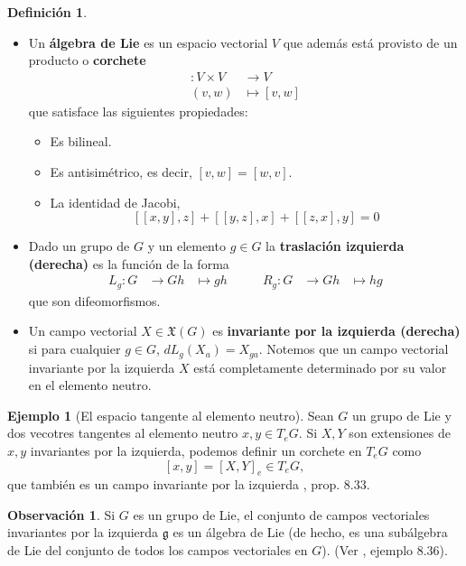 \documentclass[spanish]{book}
\theoremstyle{definition}
\newtheorem*{defn}{Definición}
\newtheorem*{obs}{Observación}
\newtheorem*{ejem}{Ejemplo}
\newcommand{\X}{\mathfrak{X}}
\begin{document}
	\begin{defn}\leavevmode
				\begin{itemize}
		\item Un \textbf{álgebra de Lie} es un espacio vectorial $V$ que además está provisto de un producto o \textbf{corchete}
		\begin{align*}
			[-,-]:V\times V&\to V\\
			(v,w)&\mapsto [v,w]
		\end{align*}
		que satisface las siguientes propiedades:
		\begin{itemize}
			\item Es bilineal.
			\item Es antisimétrico, es decir, $[v,w]=[w,v]$.
			\item La identidad de Jacobi,
			\[[[x,y],z]+[[y,z],x]+[[z,x],y]=0\]
		\end{itemize}


			\item Dado un grupo de $G$ y un elemento $g\in G$ la \textbf{traslación izquierda (derecha)} es la función de la forma
		\[\begin{aligned}
			L_g:G&\to G
			h&\mapsto gh
		\end{aligned}\qquad\begin{aligned}
		R_g:G&\to G
		h&\mapsto hg
	\end{aligned}\]
	que son difeomorfismos.
	\item Un campo vectorial $X\in\X(G)$ es \textbf{invariante por la izquierda (derecha)} si para cualquier $g\in G$, $dL_g(X_a)=X_{ga}$. Notemos que un campo vectorial invariante por la izquierda $X$ está completamente determinado por su valor en el elemento neutro. 
		\end{itemize}
	\end{defn}
	\begin{ejem}[El espacio tangente al elemento neutro]
		Sean $G$ un grupo de Lie y dos vecotres tangentes al elemento neutro $x,y\in T_eG$. Si $X,Y$ son extensiones de $x,y$ invariantes por la izquierda, podemos definir un corchete en $T_eG$ como
		\[[x,y]=[X,Y]_e\in T_eG,\]
		que también es un campo invariante por la izquierda \cite{Lee}, prop. 8.33.
	\end{ejem}
	\begin{obs}
		Si $G$ es un grupo de Lie, el conjunto de campos vectoriales invariantes por la izquierda $\mathfrak{g}$ es un álgebra de Lie (de hecho, es una subálgebra de Lie del conjunto de todos los campos vectoriales en $G$). (Ver \cite{Lee}, ejemplo 8.36).
	\end{obs}
\end{document}
